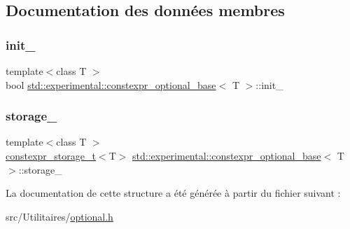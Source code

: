 \subsection{Documentation des données membres}
\mbox{\label{structstd_1_1experimental_1_1constexpr__optional__base_aef0ac13a059b733b785544ade26f3354}} 
\subsubsection{\texorpdfstring{init\+\_\+}{init\_}}
{\footnotesize\ttfamily template$<$class T $>$ \\
bool \hyperlink{structstd_1_1experimental_1_1constexpr__optional__base}{std\+::experimental\+::constexpr\+\_\+optional\+\_\+base}$<$ T $>$\+::init\+\_\+}

\mbox{\label{structstd_1_1experimental_1_1constexpr__optional__base_a21e4f97ec2334b123f8e7c7a9d50c9b1}} 
\subsubsection{\texorpdfstring{storage\+\_\+}{storage\_}}
{\footnotesize\ttfamily template$<$class T $>$ \\
\hyperlink{unionstd_1_1experimental_1_1constexpr__storage__t}{constexpr\+\_\+storage\+\_\+t}$<$T$>$ \hyperlink{structstd_1_1experimental_1_1constexpr__optional__base}{std\+::experimental\+::constexpr\+\_\+optional\+\_\+base}$<$ T $>$\+::storage\+\_\+}



La documentation de cette structure a été générée à partir du fichier suivant \+:\begin{DoxyCompactItemize}
\item 
src/\+Utilitaires/\hyperlink{optional_8h}{optional.\+h}\end{DoxyCompactItemize}
